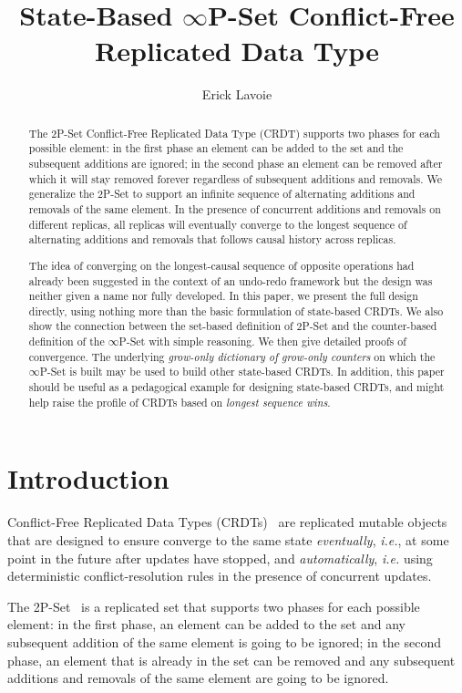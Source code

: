 \documentclass[11pt, oneside]{article}   	%
\title{State-Based $\infty$P-Set Conflict-Free Replicated Data Type}
\author{Erick Lavoie}
\begin{document}
\maketitle


\begin{abstract}
The 2P-Set Conflict-Free Replicated Data Type (CRDT) supports two phases for each possible element: in the first phase an element can be added to the set and the subsequent additions are ignored; in the second phase an element can be removed after which it will stay removed forever regardless of subsequent additions and removals. We generalize the 2P-Set to support an infinite sequence of alternating additions and removals of the same element. In the presence of concurrent additions and removals on different replicas, all replicas will eventually converge to the longest sequence of alternating additions and removals that follows causal history across replicas. 

The idea of converging on the longest-causal sequence of opposite operations had already been suggested in the context of an undo-redo framework but the design was neither given a name nor fully developed. In this paper, we present the full design directly, using nothing more than the basic formulation of state-based CRDTs. We also show the connection between the set-based definition of 2P-Set and the counter-based definition of the $\infty$P-Set with simple reasoning. We then give detailed proofs of convergence. The underlying \textit{grow-only dictionary of grow-only counters} on which the $\infty$P-Set is built may be used to build other state-based CRDTs. In addition, this paper should be useful as a pedagogical example for designing state-based CRDTs, and might help raise the profile of CRDTs based on \textit{longest sequence wins}.
\end{abstract}

\section{Introduction}

Conflict-Free Replicated Data Types (CRDTs)~\cite{shapiro:hal-00932836} are replicated mutable objects that are designed to ensure converge to the same state \textit{eventually}, \textit{i.e.}, at some point in the future after updates have stopped, and \textit{automatically}, \textit{i.e.} using deterministic conflict-resolution rules in the presence of concurrent updates. 

The 2P-Set~\cite{shapiro:inria-00555588} is a replicated set that supports two phases for each possible element: in the first phase, an element can be added to the set and any subsequent addition of the same element is going to be ignored; in the second phase, an element that is already in the set can be removed and any subsequent additions and removals of the same element are going to be ignored.
\end{document}
